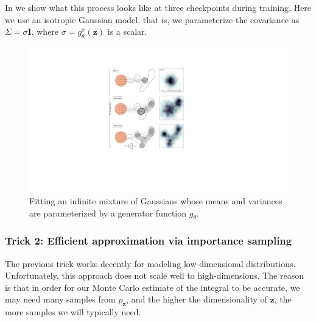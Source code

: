 In \fig{\ref{fig:generative_modeling_and_representation_learning:IGMM_training_iters}} we show what this process looks like at three checkpoints during training. Here we use an isotropic Gaussian model, that is, we parameterize the covariance as $\Sigma = \sigma\mathbf{I}$, where $\sigma = g^{\sigma}_{\theta}(\mathbf{z})$ is a scalar.
\begin{figure}[h!]
    \centerline{
    \includegraphics[width=0.7\linewidth]{./figures/generative_modeling_and_representation_learning/IGMM_training_iters.pdf}
    }
    \caption{Fitting an infinite mixture of Gaussians whose means and variances are parameterized by a generator function $g_{\theta}$.}
    \label{fig:generative_modeling_and_representation_learning:IGMM_training_iters}
\end{figure}




\subsubsection{Trick 2: Efficient approximation via importance sampling}
The previous trick works decently for modeling low-dimensional distributions. Unfortunately, this approach does not scale well to high-dimensions. The reason is that in order for our Monte Carlo estimate of the integral to be accurate, we may need many samples from $p_{\mathbf{z}}$, and the higher the dimensionality of $\mathbf{z}$, the more samples we will typically need.

